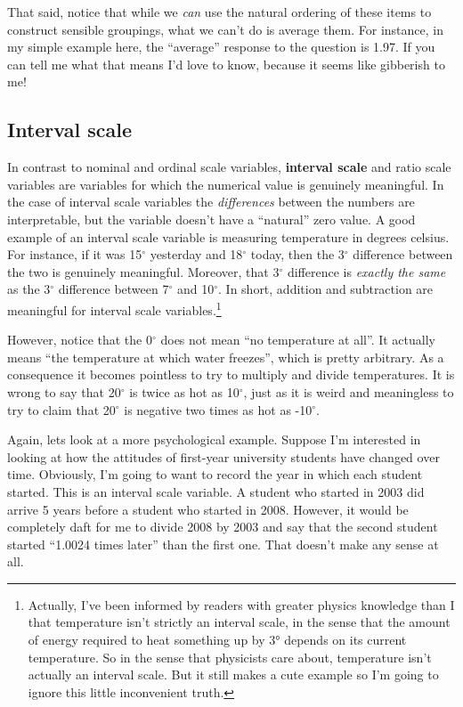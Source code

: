 \documentclass[
  a4paper,
]{book}
\begin{document}
That said, notice that while we \emph{can} use the natural ordering of
these items to construct sensible groupings, what we can't do is average
them. For instance, in my simple example here, the ``average'' response
to the question is 1.97. If you can tell me what that means I'd love to
know, because it seems like gibberish to me!

\subsection{Interval scale}\label{interval-scale}

In contrast to nominal and ordinal scale variables, \textbf{interval
scale} and ratio scale variables are variables for which the numerical
value is genuinely meaningful. In the case of interval scale variables
the \emph{differences} between the numbers are interpretable, but the
variable doesn't have a ``natural'' zero value. A good example of an
interval scale variable is measuring temperature in degrees celsius. For
instance, if it was 15\(^{\circ}\) yesterday and 18\(^{\circ}\) today,
then the 3\(^{\circ}\) difference between the two is genuinely
meaningful. Moreover, that 3\(^{\circ}\) difference is \emph{exactly the
same} as the 3\(^{\circ}\) difference between 7\(^{\circ}\) and
10\(^{\circ}\). In short, addition and subtraction are meaningful for
interval scale variables.\footnote{Actually, I've been informed by
  readers with greater physics knowledge than I that temperature isn't
  strictly an interval scale, in the sense that the amount of energy
  required to heat something up by 3° depends on its current
  temperature. So in the sense that physicists care about, temperature
  isn't actually an interval scale. But it still makes a cute example so
  I'm going to ignore this little inconvenient truth.}

However, notice that the 0\(^{\circ}\) does not mean ``no temperature at
all''. It actually means ``the temperature at which water freezes'',
which is pretty arbitrary. As a consequence it becomes pointless to try
to multiply and divide temperatures. It is wrong to say that
20\(^{\circ}\) is twice as hot as 10\(^{\circ}\), just as it is weird
and meaningless to try to claim that 20\(^{\circ}\) is negative two
times as hot as -10\(^{\circ}\).

Again, lets look at a more psychological example. Suppose I'm interested
in looking at how the attitudes of first-year university students have
changed over time. Obviously, I'm going to want to record the year in
which each student started. This is an interval scale variable. A
student who started in 2003 did arrive 5 years before a student who
started in 2008. However, it would be completely daft for me to divide
2008 by 2003 and say that the second student started ``1.0024 times
later'' than the first one. That doesn't make any sense at all.
\end{document}
